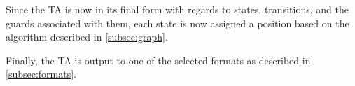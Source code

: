 Since the TA is now in its final form with regards to states, transitions, and the guards associated with them, each state is now assigned a position based on the algorithm described in \cref{subsec:graph}.

Finally, the TA is output to one of the selected formats as described in \cref{subsec:formats}.












